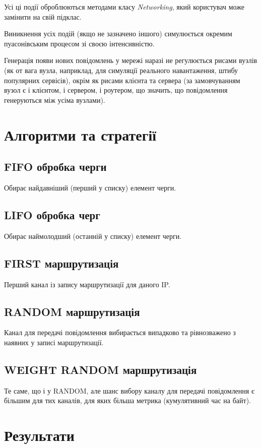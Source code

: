 \documentclass[11pt,a4paper]{article}
\begin{document}
Усі ці події оброблюються методами класу \emph{Networking}, 
який користувач може замінити на свій підклас.

Виникнення усіх подій (якщо не зазначено іншого) симулюється окремим 
пуасонівським процесом зі своєю інтенсивністю.

Генерація появи нових повідомлень у мережі наразі не регулюється
рисами вузлів (як от вага вузла, наприклад, для симуляції реального навантаження, штибу популярних сервісів), окрім як рисами клієнта та сервера (за замовчуванням вузол є і клієнтом, і сервером, і роутером, що значить, що повідомлення генеруються між усіма вузлами).

\section{Алгоритми та стратегії}

\subsection{FIFO обробка черги}
Обирає найдавніший (перший у списку) елемент черги.

\subsection{LIFO обробка черг}
Обирає наймолодший (останній у списку) елемент черги.

\subsection{FIRST маршрутизація}
Перший канал із запису маршрутизації для даного IP.

\subsection{RANDOM маршрутизація}
Канал для передачі повідомлення вибирається випадково та рівнозважено з наявних у записі маршрутизації.

\subsection{WEIGHT RANDOM маршрутизація}
Те саме, що і у RANDOM, але
шанс вибору каналу для передачі повідомлення є більшим для тих каналів, для
яких більша метрика (кумулятивний час на байт).

\section{Результати}
\end{document}
